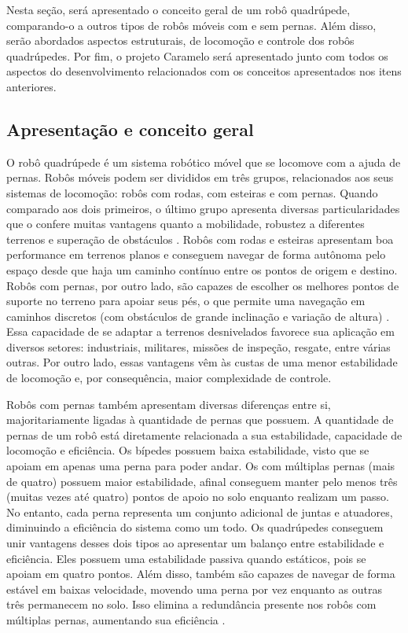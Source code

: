 \documentclass[../main.tex]{subfiles}
\begin{document}
Nesta seção, será apresentado o conceito geral de um robô quadrúpede, comparando-o a outros tipos de robôs móveis com e sem pernas. Além disso, serão abordados aspectos estruturais, de locomoção e controle dos robôs quadrúpedes. Por fim, o projeto Caramelo será apresentado junto com todos os aspectos do desenvolvimento relacionados com os conceitos apresentados nos itens anteriores.

\subsection{Apresentação e conceito geral}
O robô quadrúpede é um sistema robótico móvel que se locomove com a ajuda de pernas. Robôs móveis podem ser divididos em três grupos, relacionados aos seus sistemas de locomoção: robôs com rodas, com esteiras e com pernas. Quando comparado aos dois primeiros, o último grupo apresenta diversas particularidades que o confere muitas vantagens quanto a mobilidade, robustez a diferentes terrenos e superação de obstáculos \cite{Biswal2021}. Robôs com rodas e esteiras apresentam boa performance em terrenos planos e conseguem navegar de forma autônoma pelo espaço desde que haja um caminho contínuo entre os pontos de origem e destino. Robôs com pernas, por outro lado, são capazes de escolher os melhores pontos de suporte no terreno para apoiar seus pés, o que permite uma navegação em caminhos discretos (com obstáculos de grande inclinação e variação de altura) \cite{Yao2021}. Essa capacidade de se adaptar a terrenos desnivelados favorece sua aplicação em diversos setores: industriais, militares, missões de inspeção, resgate, entre várias outras. Por outro lado, essas vantagens vêm às custas de uma menor estabilidade de locomoção e, por consequência, maior complexidade de controle.

Robôs com pernas também apresentam diversas diferenças entre si, majoritariamente ligadas à quantidade de pernas que possuem. A quantidade de pernas de um robô está diretamente relacionada a sua estabilidade, capacidade de locomoção e eficiência. Os bípedes possuem baixa estabilidade, visto que se apoiam em apenas uma perna para poder andar. Os com múltiplas pernas (mais de quatro) possuem maior estabilidade, afinal conseguem manter pelo menos três (muitas vezes até quatro) pontos de apoio no solo enquanto realizam um passo. No entanto, cada perna representa um conjunto adicional de juntas e atuadores, diminuindo a eficiência do sistema como um todo. Os quadrúpedes conseguem unir vantagens desses dois tipos ao apresentar um balanço entre estabilidade e eficiência. Eles possuem uma estabilidade passiva quando estáticos, pois se apoiam em quatro pontos. Além disso, também são capazes de navegar de forma estável em baixas velocidade, movendo uma perna por vez enquanto as outras três permanecem no solo. Isso elimina a redundância presente nos robôs com múltiplas pernas, aumentando sua eficiência \cite{Yao2021}.
\end{document}
